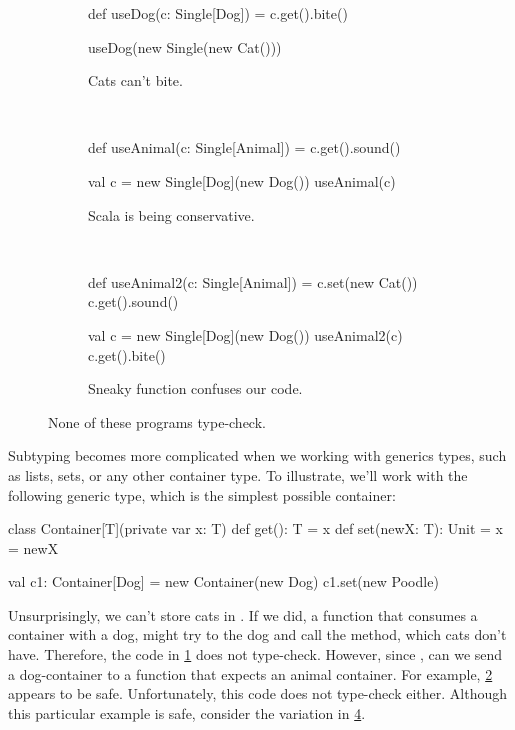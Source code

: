\documentclass[9pt]{extbook}
\begin{document}
\begin{figure}
\begin{subfigure}[b]{0.26\textwidth}
\begin{scalacode}
def useDog(c: Single[Dog]) = {
  c.get().bite()
}

useDog(new Single(new Cat()))
\end{scalacode}
\caption{Cats can't bite.}
\label{catdog1}
\end{subfigure}
~\vrule~
\begin{subfigure}[b]{0.33\textwidth}
\begin{scalacode}
def useAnimal(c: Single[Animal]) = {
  c.get().sound()
}

val c = new Single[Dog](new Dog())
useAnimal(c)
\end{scalacode}
\label{catdog2}
\caption{Scala is being conservative.}
\end{subfigure}
~\vrule~
\begin{subfigure}[b]{0.31\textwidth}
\begin{scalacode}
def useAnimal2(c: Single[Animal]) = {
  c.set(new Cat())
  c.get().sound()
}

val c = new Single[Dog](new Dog())
useAnimal2(c)
c.get().bite()
\end{scalacode}
\label{catdog3}
\caption{Sneaky function confuses our code.}
\end{subfigure}
\caption{None of these programs type-check.}
\end{figure}

Subtyping becomes more complicated when we working with generics types, such
as lists, sets, or any other container type. To illustrate, we'll work
with the following generic type, which is the simplest possible container:
%
\begin{scalacode}
class Container[T](private var x: T) {
  def get(): T = x
  def set(newX: T): Unit = x = newX
}

val c1: Container[Dog] = new Container(new Dog)
c1.set(new Poodle)
\end{scalacode}

Unsurprisingly, we can't store cats in . If we did, a function
that consumes a container with a dog, might try to  the
dog and call the  method, which cats don't have.
Therefore, the code in \cref{catdog1} does not type-check.
However, since , can we send a dog-container
to a function that expects an animal container. For example, \cref{catdog2}
appears to be safe. Unfortunately, this code does not type-check either. Although this particular example
is safe, consider the variation in \cref{catdog3}.
\end{document}

